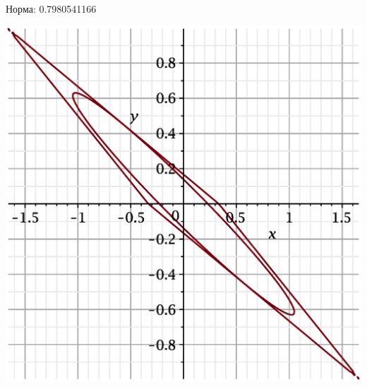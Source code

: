 \documentclass{beamer}
\begin{document}
\begin{frame}
Норма: 0.7980541166
    \begin{center}
        \includegraphics[scale=0.4]{pictures/10.eps}
    \end{center}
\end{frame}
\end{document}
